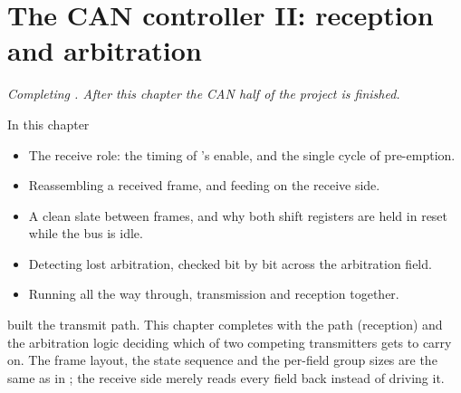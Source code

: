 
\chapter{The CAN controller II: reception and arbitration}
\label{c17:ch}

{\large\itshape Completing . After this chapter the CAN half of the project is
finished.\par}

\begin{chapterbox}{In this chapter}
\begin{itemize}
  \item The receive role: the timing of 's enable, and the single cycle of
    pre-emption.
  \item Reassembling a received frame, and feeding  on the receive side.
  \item A clean slate between frames, and why both shift registers are held in reset while the bus is
    idle.
  \item Detecting lost arbitration, checked bit by bit across the arbitration field.
  \item Running  all the way through, transmission and reception together.
\end{itemize}
\end{chapterbox}

 built the transmit path. This chapter completes  with the
 path (reception) and the arbitration logic deciding which of two competing
transmitters gets to carry on. The frame layout, the state sequence and the per-field group sizes are
the same as in ; the receive side merely reads every field back instead of driving
it.




